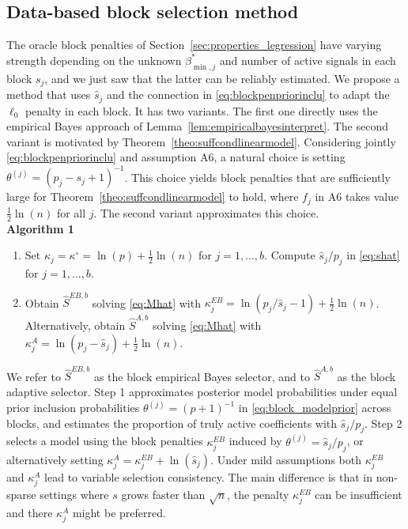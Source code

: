 \documentclass[aos]{imsart}
\theoremstyle{plain}
\begin{document}
\subsection{Data-based block selection method}

The oracle block penalties of Section~\ref{sec:properties_legression} have varying strength depending on the unknown $\beta^*_{\min,j}$ and number of active signals in each block $s_j$, and we just saw that
the latter can be reliably estimated. We propose a method that uses $\widehat{s}_j$ and the connection in \eqref{eq:blockpenpriorinclu} to adapt the $\ell_0$ penalty in each block. It has two variants. The first one directly uses the empirical Bayes approach of Lemma~\ref{lem:empiricalbayesinterpret}. %
The second variant is motivated by Theorem~\ref{theo:suffcondlinearmodel}. Considering jointly \eqref{eq:blockpenpriorinclu} and assumption A6, a natural choice is setting $\theta^{(j)}=(p_j-s_j+1)^{-1}$. This choice yields block penalties that are sufficiently large for Theorem~\ref{theo:suffcondlinearmodel} to hold, where $f_j$ in A6 takes value $\frac{1}{2}\ln(n)$ for all $j$. The second variant approximates this choice.\\

\textbf{Algorithm 1}
\begin{enumerate}
    \item Set $\kappa_j=\kappa^{\circ}=\ln(p)+\frac{1}{2}\ln(n)$ 
    for $j=1,\ldots,b$. Compute $\widehat{s}_j/p_j$ in \eqref{eq:shat} for $j=1,\ldots,b$.

    \item Obtain $\hat{S}^{EB,b}$ solving \eqref{eq:Mhat} with $\kappa_j^{EB}= \ln(p_j/\widehat{s}_j -1)+ \tfrac{1}{2}\ln(n)$.
    Alternatively, obtain $\hat{S}^{A,b}$ solving \eqref{eq:Mhat} with
    $\kappa_j^{A} = \ln(p_j-\widehat{s}_j)+ \tfrac{1}{2}\ln(n)$.
\end{enumerate}

We refer to $\hat{S}^{EB,b}$ as the block empirical Bayes selector, and to $\hat{S}^{A,b}$ as the block adaptive selector.
Step 1 approximates posterior model probabilities under equal prior inclusion probabilities $\theta^{(j)}=(p+1)^{-1}$ in \eqref{eq:block_modelprior} across blocks, and estimates the proportion of truly active coefficients with $\hat{s}_j/p_j$. Step 2 selects a model using the block penalties $\kappa_j^{EB}$ induced by $\theta^{(j)}=\hat{s}_j/p_j$,
or alternatively setting $\kappa_j^{A}= \kappa_j^{EB} + \ln(\hat{s}_j)$.
Under mild assumptions both $\kappa_j^{EB}$ and $\kappa_j^{A}$ lead to variable selection consistency.
The main difference is that in non-sparse settings where $s$ grows faster than $\sqrt{n}$, the penalty $\kappa_j^{EB}$ can be insufficient and there $\kappa_j^{A}$ might be preferred.
\end{document}
